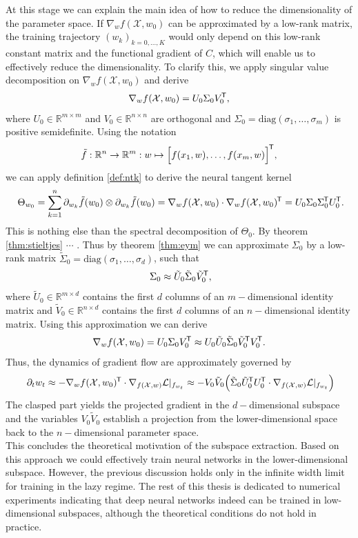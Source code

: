 \documentclass[11pt, a4paper]{article}
\newcommand{\R}{\mathbb{R}}
\newcommand{\X}{\mathcal{X}}
\renewcommand{\L}{\mathcal{L}}
\newcommand*{\tr}{^{\mkern-1.5mu\mathsf{T}}}
\begin{document}
At this stage we can explain the main idea of how to reduce the dimensionality of the parameter space. If $\nabla_wf(\X,w_0)$ can be approximated by a low-rank matrix, the training trajectory $(w_k)_{k=0, \dots, K}$ would only depend on this low-rank constant matrix and the functional gradient of $C$, which will enable us to effectively reduce the dimensionality. To clarify this, we apply singular value decomposition on $\nabla_wf(\X,w_0)$ and derive
\[ \nabla_wf(\X,w_0) = U_0 \Sigma_0 V_0\tr , \]
where $U_0 \in \R^{m \times m}$ and $V_0 \in \R^{n \times n}$ are orthogonal and $\Sigma_0 = \text{diag}(\sigma_1, \dots, \sigma_m)$ is positive semidefinite. Using the notation
\[ \tilde{f}: \R^n \to \R^m : w \mapsto \Big [ f(x_1,w), \dots, f(x_m,w) \Big ]\tr , \]
we can apply definition \ref{def:ntk} to derive the neural tangent kernel
\[ \Theta_{w_0} = \sum_{k=1}^{n} \partial_{w_k} \tilde{f}(w_0) \otimes \partial_{w_k} \tilde{f}(w_0) = \nabla_wf(\X,w_0) \cdot \nabla_wf(\X,w_0)\tr  = U_0 \Sigma_0 \Sigma_0\tr  U_0\tr . \]
This is nothing else than the spectral decomposition of $\Theta_0$. By theorem \ref{thm:stieltjes} $\cdots$ . Thus by theorem \ref{thm:eym} we can approximate $\Sigma_0$ by a low-rank matrix $\tilde{\Sigma}_0 = \text{diag}(\sigma_1, \dots, \sigma_d)$, such that
\[ \Sigma_0 \approx \tilde{U}_0 \tilde{\Sigma}_0 \tilde{V}_0\tr , \]
where $\tilde{U}_0 \in \R^{m \times d}$ contains the first $d$ columns of an $m-$dimensional identity matrix and $\tilde{V}_0 \in \R^{n \times d}$ contains the first $d$ columns of an $n-$dimensional identity matrix. Using this approximation we can derive
\[ \nabla_wf(\X,w_0) = U_0 \Sigma_0 V_0\tr  \approx U_0 \tilde{U}_0 \tilde{\Sigma}_0 \tilde{V}_0\tr  V_0\tr . \]
Thus, the dynamics of gradient flow are approximately governed by
\[ \partial_t w_t \approx -\nabla_wf(\X,w_0)\tr  \cdot \nabla_{f(\X,w)} \L|_{f_{w_t}} \approx - V_0 \tilde{V}_0 \Big ( \tilde{\Sigma}_0 \tilde{U}_0\tr  U_0\tr  \cdot \nabla_{f(\X,w)} \L|_{f_{w_t}} \Big ) \]
The clasped part yields the projected gradient in the $d-$dimensional subspace and the variables $V_0 \tilde{V}_0$ establish a projection from the lower-dimensional space back to the $n-$dimensional parameter space. \\

This concludes the theoretical motivation of the subspace extraction. Based on this approach we could effectively train neural networks in the lower-dimensional subspace. However, the previous discussion holds only in the infinite width limit for training in the lazy regime. The rest of this thesis is dedicated to numerical experiments indicating that deep neural networks indeed can be trained in low-dimensional subspaces, although the theoretical conditions do not hold in practice. \\
\end{document}
